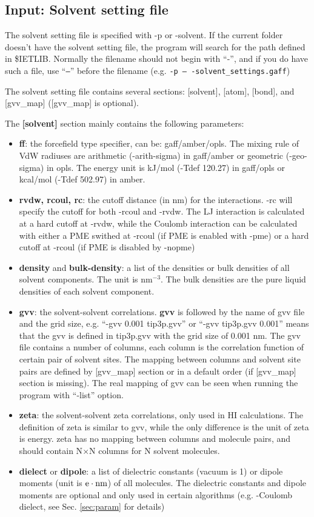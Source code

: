 \documentclass[aip,amsmath,amssymb,reprint,onecolumn]{revtex4-1}
\begin{document}
\subsection{Input: Solvent setting file}\label{sec:io.solvent}

The solvent setting file is specified with -p or -solvent. If the current folder doesn't have the solvent setting file, the program will search for the path defined in \$IETLIB. Normally the filename should not begin with ``-'', and if you do have such a file, use ``\texttt{--}'' before the filename (e.g. \texttt{-p -- -solvent\_settings.gaff})

The solvent setting file contains several sections: [solvent], [atom], [bond], and [gvv\_map] ([gvv\_map] is optional).

The {\bf [solvent]} section mainly contains the following parameters:
\begin{itemize}
  \item {\textbf{ff}}: the forcefield type specifier, can be: gaff/amber/opls. The mixing rule of VdW radiuses are arithmetic (-arith-sigma) in gaff/amber or geometric (-geo-sigma) in opls. The energy unit is kJ/mol (-Tdef 120.27) in gaff/opls or kcal/mol (-Tdef 502.97) in amber.
  \item {\textbf{rvdw, rcoul, rc}}: the cutoff distance (in nm) for the interactions. -rc will specify the cutoff for both -rcoul and -rvdw. The LJ interaction is calculated at a hard cutoff at -rvdw, while the Coulomb interaction can be calculated with either a PME swithed at -rcoul (if PME is enabled with -pme) or a hard cutoff at -rcoul (if PME is disabled by -nopme)
  \item {\textbf{density}} and {\textbf{bulk-density}}: a list of the densities or bulk densities of all solvent components. The unit is nm$^{-3}$. The bulk densities are the pure liquid densities of each solvent component.
  \item {\textbf{gvv}}: the solvent-solvent correlations. {\textbf{gvv}} is followed by the name of gvv file and the grid size, e.g. ``-gvv 0.001 tip3p.gvv'' or ``-gvv tip3p.gvv 0.001'' means that the gvv is defined in tip3p.gvv with the grid size of 0.001 nm. The gvv file contains a number of columns, each column is the correlation function of certain pair of solvent sites. The mapping between columns and solvent site pairs are defined by [gvv\_map] section or in a default order (if [gvv\_map] section is missing). The real mapping of gvv can be seen when running the program with ``-list'' option.
  \item {\textbf{zeta}}: the solvent-solvent zeta correlations, only used in HI calculations. The definition of zeta is similar to gvv, while the only difference is the unit of zeta is energy. zeta has no mapping between columns and molecule pairs, and should contain N$\times$N columns for N solvent molecules.
  \item {\textbf{dielect}} or {\textbf{dipole}}: a list of dielectric constants (vacuum is 1) or dipole moments (unit is $\rm e\cdot nm$) of all molecules. The dielectric constants and dipole moments are optional and only used in certain algorithms (e.g. -Coulomb dielect, see Sec. \ref{sec:param} for details)
\end{itemize}
\end{document}
